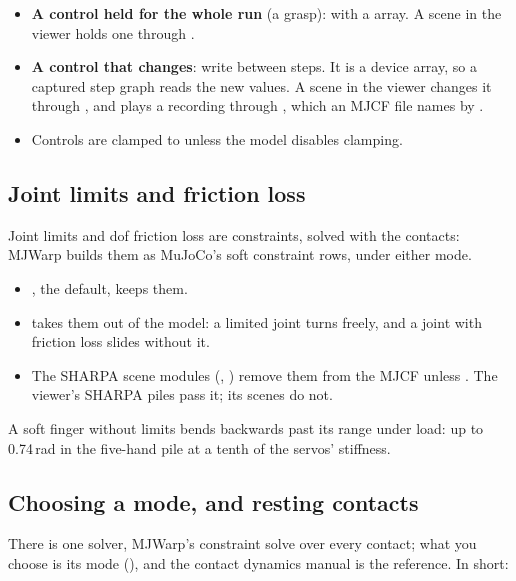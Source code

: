 \begin{itemize}
\item \textbf{A control held for the whole run} (a grasp):  with a  array. A scene in the viewer holds one through .
\item \textbf{A control that changes}: write  between steps. It is a device array, so a captured step graph reads the new values. A scene in the viewer changes it through , and plays a recording through , which an MJCF file names by .
\item Controls are clamped to  unless the model disables clamping.
\end{itemize}

\subsection{Joint limits and friction loss}\label{sec:joints}

Joint limits and dof friction loss are constraints, solved with the contacts: MJWarp builds them as MuJoCo's soft constraint rows, under either mode.

\begin{itemize}
\item {}, the default, keeps them.
\item {} takes them out of the model: a limited joint turns freely, and a joint with friction loss slides without it.
\item The SHARPA scene modules (, ) remove them from the MJCF unless . The viewer's SHARPA piles pass it; its  scenes do not.
\end{itemize}

A soft finger without limits bends backwards past its range under load: up to 0.74\,rad in the five-hand pile at a tenth of the servos' stiffness.

\subsection{Choosing a mode, and resting contacts}\label{sec:solver}

There is one solver, MJWarp's constraint solve over every contact; what you choose is its mode (), and the contact dynamics manual is the reference. In short:

